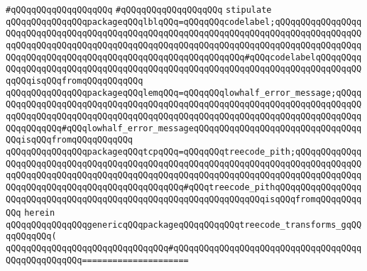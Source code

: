 \verb|#qQQqqQQqqQQqqQQqqQQq|\newline
\verb|#qQQqqQQqqQQqqQQqqQQq|\newline
\newline
\newline
\verb|stipulate|\newline
\verb|qQQqqQQqqQQqqQQqpackageqQQqlblqQQq=qQQqqQQqcodelabel;qQQqqQQqqQQqqQQqqQQqqQQqqQQqqQQqqQQqqQQqqQQqqQQqqQQqqQQqqQQqqQQqqQQqqQQqqQQqqQQqqQQqqQQqqQQqqQQqqQQqqQQqqQQqqQQqqQQqqQQqqQQqqQQqqQQqqQQqqQQqqQQqqQQqqQQqqQQqqQQqqQQqqQQqqQQqqQQqqQQqqQQqqQQqqQQqqQQqqQQqqQQq#qQQqcodelabelqQQqqQQqqQQqqQQqqQQqqQQqqQQqqQQqqQQqqQQqqQQqqQQqqQQqqQQqqQQqqQQqqQQqqQQqqQQqqQQqqQQqisqQQqfromqQQqqQQqqQQq|\newline
\verb|qQQqqQQqqQQqqQQqpackageqQQqlemqQQq=qQQqqQQqlowhalf_error_message;qQQqqQQqqQQqqQQqqQQqqQQqqQQqqQQqqQQqqQQqqQQqqQQqqQQqqQQqqQQqqQQqqQQqqQQqqQQqqQQqqQQqqQQqqQQqqQQqqQQqqQQqqQQqqQQqqQQqqQQqqQQqqQQqqQQqqQQqqQQqqQQqqQQqqQQqqQQq#qQQqlowhalf_error_messageqQQqqQQqqQQqqQQqqQQqqQQqqQQqqQQqqQQqisqQQqfromqQQqqQQqqQQq|\newline
\verb|qQQqqQQqqQQqqQQqpackageqQQqtcpqQQq=qQQqqQQqtreecode_pith;qQQqqQQqqQQqqQQqqQQqqQQqqQQqqQQqqQQqqQQqqQQqqQQqqQQqqQQqqQQqqQQqqQQqqQQqqQQqqQQqqQQqqQQqqQQqqQQqqQQqqQQqqQQqqQQqqQQqqQQqqQQqqQQqqQQqqQQqqQQqqQQqqQQqqQQqqQQqqQQqqQQqqQQqqQQqqQQqqQQqqQQqqQQq#qQQqtreecode_pithqQQqqQQqqQQqqQQqqQQqqQQqqQQqqQQqqQQqqQQqqQQqqQQqqQQqqQQqqQQqqQQqqQQqisqQQqfromqQQqqQQqqQQq|\newline
\verb|herein|\newline
\newline
\verb|qQQqqQQqqQQqqQQqgenericqQQqpackageqQQqqQQqqQQqtreecode_transforms_gqQQqqQQqqQQq(|\newline
\verb|qQQqqQQqqQQqqQQqqQQqqQQqqQQqqQQq#qQQqqQQqqQQqqQQqqQQqqQQqqQQqqQQqqQQqqQQqqQQqqQQqqQQq=====================|\newline

